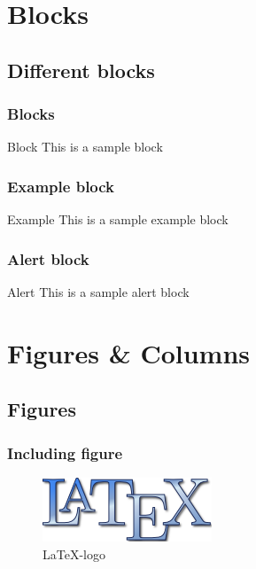 \documentclass{beamer}
\begin{document}
\section{Blocks}
\subsection{Different blocks}
\begin{frame}
	\frametitle{Blocks}
		\begin{block}{Block}
			This is a sample block
		\end{block}
\end{frame}
\begin{frame}
		\frametitle{Example block}
		\begin{exampleblock}{Example}
			This is a sample example block
		\end{exampleblock}
\end{frame}
\begin{frame}
		\frametitle{Alert block}
		\begin{alertblock}{Alert}
			This is a sample alert block
		\end{alertblock}
\end{frame}	

\section{Figures \& Columns}
\subsection{Figures}
\begin{frame}
	\frametitle{Including figure}
	\begin{figure}
		\centering
		\includegraphics[scale=0.1]{figures/latexlogo.png}
		\caption{\LaTeX-logo}
	\end{figure}
\end{frame}
\end{document}
